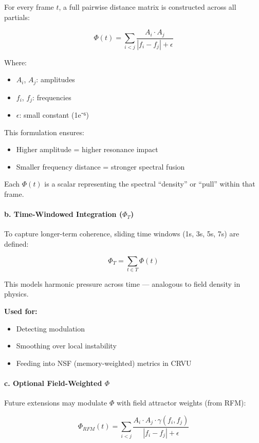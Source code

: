 \documentclass{article}
\begin{document}
For every frame $t$, a full pairwise distance matrix is constructed across all partials:

\[
\Phi(t) = \sum_{i<j} \frac{A_i \cdot A_j}{|f_i - f_j| + \epsilon}
\]

Where:

\begin{itemize}
    \item $A_i$, $A_j$: amplitudes
    \item $f_i$, $f_j$: frequencies
    \item $\epsilon$: small constant (1e⁻⁶)
\end{itemize}

This formulation ensures:

\begin{itemize}
    \item Higher amplitude = higher resonance impact
    \item Smaller frequency distance = stronger spectral fusion
\end{itemize}

Each $\Phi(t)$ is a scalar representing the spectral “density” or “pull” within that frame.

\paragraph{b. Time-Windowed Integration ($\Phi_T$)}

To capture longer-term coherence, sliding time windows (1s, 3s, 5s, 7s) are defined:

\[
\Phi_T = \sum_{t \in T} \Phi(t)
\]

This models harmonic pressure across time — analogous to field density in physics.

\textbf{Used for:}
\begin{itemize}
    \item Detecting modulation
    \item Smoothing over local instability
    \item Feeding into NSF (memory-weighted) metrics in CRVU
\end{itemize}

\paragraph{c. Optional Field-Weighted $\Phi$}

Future extensions may modulate $\Phi$ with field attractor weights (from RFM):

\[
\Phi_{RFM}(t) = \sum_{i<j} \frac{A_i \cdot A_j \cdot \gamma(f_i, f_j)}{|f_i - f_j| + \epsilon}
\]
\end{document}
